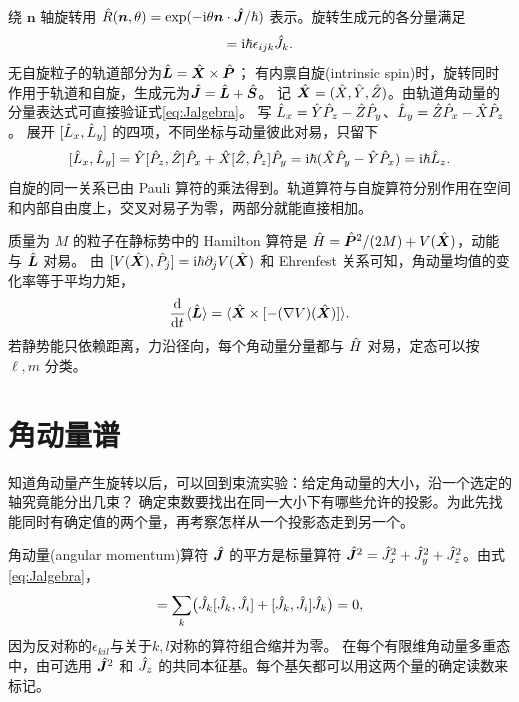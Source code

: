绕 $\bm n$ 轴旋转用 $\hat{R}(\bm n,\theta) = \exp(-\mathrm{i}\theta\bm n \cdot \hat{\bm{J}}/\hbar)$ 表示。旋转生成元的各分量满足
\begin{equation}
    [\op{J}_i,\op{J}_j] = \i\hbar\epsilon_{ijk}\op{J}_k.
    \label{eq:Jalgebra}
\end{equation}
无自旋粒子的轨道部分为$\hat{\bm{L}} = \hat{\bm{X}} \times \hat{\bm{P}}$；
有内禀自旋(intrinsic spin)时，旋转同时作用于轨道和自旋，生成元为$\hat{\bm{J}} = \hat{\bm{L}} + \hat{\bm{S}}$。
记 $\hat{\bm{X}} = (\hat{X},\hat{Y},\hat{Z})$。由轨道角动量的分量表达式可直接验证式\eqref{eq:Jalgebra}。
写 $\hat{L}_x = \hat{Y}\hat{P}_z - \hat{Z}\hat{P}_y$、$\hat{L}_y = \hat{Z}\hat{P}_x - \hat{X}\hat{P}_z$。
展开 $[\hat{L}_x,\hat{L}_y]$ 的四项，不同坐标与动量彼此对易，只留下
\[
    [\hat{L}_x,\hat{L}_y] = \hat{Y}[\hat{P}_z,\hat{Z}]\hat{P}_x + \hat{X}[\hat{Z},\hat{P}_z]\hat{P}_y
        = \mathrm{i}\hbar(\hat{X}\hat{P}_y - \hat{Y}\hat{P}_x) = \mathrm{i}\hbar \hat{L}_z .
\]
自旋的同一关系已由 Pauli 算符的乘法得到。轨道算符与自旋算符分别作用在空间和内部自由度上，交叉对易子为零，两部分就能直接相加。

质量为 $M$ 的粒子在静标势中的 Hamilton 算符是 $\hat{H} = \hat{\bm{P}}^2/(2M) + V(\hat{\bm{X}})$，动能与 $\hat{\bm{L}}$ 对易。
由 $[V(\hat{\bm{X}}),\hat{P}_j] = \mathrm{i}\hbar\partial_j V(\hat{\bm{X}})$ 和 Ehrenfest 关系可知，角动量均值的变化率等于平均力矩，
\begin{equation}
    \frac{\mathop{}\!\mathrm{d}^{}}{\mathrm{d}{t}^{}}\langle\hat{\bm{L}}\rangle = \langle\hat{\bm{X}} \times [-(\nabla V)(\hat{\bm{X}})]\rangle.
\end{equation}
若静势能只依赖距离，力沿径向，每个角动量分量都与 $\hat{H}$ 对易，定态可以按 $\ell,m$ 分类。

\section{角动量谱}

知道角动量产生旋转以后，可以回到束流实验：给定角动量的大小，沿一个选定的轴究竟能分出几束？
确定束数要找出在同一大小下有哪些允许的投影。为此先找能同时有确定值的两个量，再考察怎样从一个投影态走到另一个。

角动量(angular momentum)算符 $\hat{\bm{J}}$ 的平方是标量算符 $\hat{\bm{J}}^2 = \hat{J}_x^2 + \hat{J}_y^2 + \hat{J}_z^2$。由式\eqref{eq:Jalgebra}，
\begin{equation}
    [\opbm{J}^2,\op{J}_i]
    = \sum_k\bigp{\op{J}_k[\op{J}_k,\op{J}_i] + [\op{J}_k,\op{J}_i]\op{J}_k} = 0,
\end{equation}
因为反对称的$\epsilon_{kil}$与关于$k,l$对称的算符组合缩并为零。
在每个有限维角动量多重态中，由可选用 $\hat{\bm{J}}^2$ 和 $\hat{J}_z$ 的共同本征基。每个基矢都可以用这两个量的确定读数来标记。

